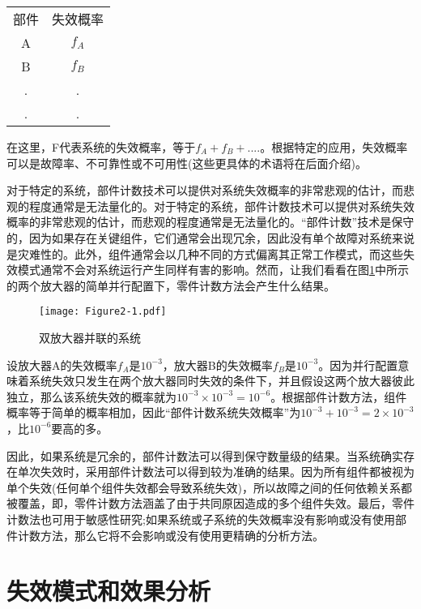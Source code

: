 \documentclass[cn,11pt,chinese]{elegantbook}
\begin{document}
\begin{table}
	\centering
	\begin{tabular}{c c}
		部件& 失效概率  \\
		A &  $f_A$\\
		B & $f_B$  \\
		. & .  \\
		. & .  \\
	\end{tabular}
\end{table}

在这里，F代表系统的失效概率，等于$f_A+f_B+....$。根据特定的应用，失效概率可以是故障率、不可靠性或不可用性(这些更具体的术语将在后面介绍)。

对于特定的系统，部件计数技术可以提供对系统失效概率的非常悲观的估计，而悲观的程度通常是无法量化的。对于特定的系统，部件计数技术可以提供对系统失效概率的非常悲观的估计，而悲观的程度通常是无法量化的。“部件计数”技术是保守的，因为如果存在关键组件，它们通常会出现冗余，因此没有单个故障对系统来说是灾难性的。此外，组件通常会以几种不同的方式偏离其正常工作模式，而这些失效模式通常不会对系统运行产生同样有害的影响。然而，让我们看看在图\ref{fig:fig2_1}中所示的两个放大器的简单并行配置下，零件计数方法会产生什么结果。

\begin{figure}[htpb]
	\centering
	\texttt{[image: Figure2-1.pdf]}
	\caption{双放大器并联的系统}\label{fig:fig2_1}
\end{figure}

设放大器A的失效概率$f_A$是$10^{-3}$，放大器B的失效概率$f_B$是$10^{-3}$。因为并行配置意味着系统失效只发生在两个放大器同时失效的条件下，并且假设这两个放大器彼此独立，那么该系统失效的概率就为$10^{-3}\times 10^{-3} = 10^{-6}$。根据部件计数方法，组件概率等于简单的概率相加，因此“部件计数系统失效概率”为$10^{-3}+10^{-3}=2 \times 10^{-3}$，比$10^{-6}$要高的多。

因此，如果系统是冗余的，部件计数法可以得到保守数量级的结果。当系统确实存在单次失效时，采用部件计数法可以得到较为准确的结果。因为所有组件都被视为单个失效(任何单个组件失效都会导致系统失效)，所以故障之间的任何依赖关系都被覆盖，即，零件计数方法涵盖了由于共同原因造成的多个组件失效。最后，零件计数法也可用于敏感性研究;如果系统或子系统的失效概率没有影响或没有使用部件计数方法，那么它将不会影响或没有使用更精确的分析方法。

\section{失效模式和效果分析}
\end{document}
